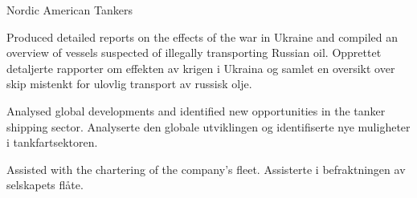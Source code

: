\cventry
{}
{Nordic American Tankers}
{}
{}

\begin{cvbullets}
  \item \enor
  {Produced detailed reports on the effects of the war in Ukraine
    and compiled an overview of vessels suspected of illegally
    transporting Russian oil.}
  {Opprettet detaljerte rapporter om effekten av krigen i Ukraina og
    samlet en oversikt over skip mistenkt for ulovlig transport av
    russisk olje.}
  \item \enor
  {Analysed global developments and identified new opportunities in
    the tanker shipping sector.}
  {Analyserte den globale utviklingen og identifiserte nye
    muligheter i tankfartsektoren.}
  \item \enor
  {Assisted with the chartering of the company's fleet.}
  {Assisterte i befraktningen av selskapets flåte.}
\end{cvbullets}
